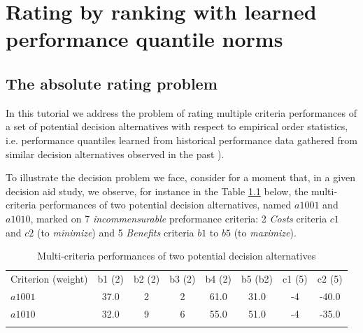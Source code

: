 \chapter{Rating by ranking with learned performance quantile norms}
\label{sec:10}



\section{The absolute rating problem}
\label{sec:10.1}
	  
In this tutorial we address the problem of rating multiple criteria performances of a set of potential decision alternatives with respect to empirical order statistics, i.e. performance quantiles learned from historical performance data gathered from similar decision alternatives observed in the past \cite{CPSTAT-L5}).

To illustrate the decision problem we face, consider for a moment that, in a given decision aid study, we observe, for instance in the Table \ref{tab:10.1} below, the multi-criteria performances of two potential decision alternatives, named $a1001$ and $a1010$, marked on 7 \emph{incommensurable} preformance criteria: 2 \emph{Costs} criteria $c1$ and $c2$ (to \emph{minimize}) and 5 \emph{Benefits} criteria $b1$ to $b5$ (to \emph{maximize}). 

\begin{table}[h]
\caption{Multi-criteria performances of two potential decision alternatives}
\label{tab:10.1}       %
\begin{center}
    \begin{tabular}{l|c|c|c|c|c|c|c}
      \hline\noalign{\smallskip}
      Criterion (weight) & b1 (2) & b2 (2) & b3 (2) & b4 (2) & b5 (b2) & c1 (5) & c2 (5)\\
      \noalign{\smallskip}\hline\noalign{\smallskip}
    $a1001$ &   37.0  &  2 & 2 & 61.0 & 31.0 & -4 & -40.0\\
    $a1010$ &   32.0 & 9 & 6 & 55.0 & 51.0 & -4 & -35.0 \\
      \noalign{\smallskip}\hline
    \end{tabular}
\end{center}
\end{table}

